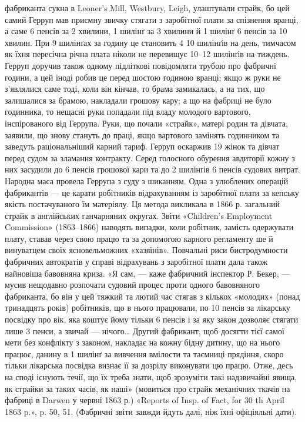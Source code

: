 {фабриканта сукна в Leoner’s Mill, Westbury, Leigh, улаштували страйк,
бо цей самий Герруп мав приємну звичку стягати з заробітної плати за
спізнення вранці, а саме 6 пенсів за 2 хвилини, 1 шилінґ за 3 хвилини й
1 шилінґ 6 пенсів за 10 хвилин. При 9 шилінґах за годину це становить
4 10 шилінґів на день, тимчасом як їхня пересічна річна
плата ніколи не перевищує 10--12 шилінґів на тиждень. Герруп доручив
також одному підліткові повідомляти трубою про фабричні години,
а цей іноді робив це перед шостою годиною вранці; якщо ж руки не з’являлися
саме тоді, коли він кінчав, то брама замикалась, а на тих, що залишалися
за брамою, накладали грошову кару; а що на фабриці не було
годинника, то нещасні руки попадали під владу молодого вартового,
інспірованого від Геррупа. Руки, що почали «страйк», матері родин
та дівчата, заявили, що знову стануть до праці, якщо вартового замінять
годинником та заведуть раціональніший карний тариф. Герруп
оскаржив 19 жінок та дівчат перед судом за зламання контракту. Серед
голосного обурення авдиторії кожну з них засудили до 6 пенсів грошової
кари та до 2 шилінґів 6 пенсів судових витрат. Народна маса провела
Геррупа з суду з шиканням. Одна з улюблених операцій фабрикантів
— це карати робітників відрахуванням із заробітної плати за
кепську якість постачуваного їм матеріялу. Ця метода викликала в 1866 р.
загальний страйк в англійських ганчарняних округах. Звіти «Children’s
Employment Commission» (1863--1866) наводять випадки, коли робітник,
замість одержувати плату, ставав через свою працю та за допомогою
карного регламенту ше й винуватцем своїх ясновельможних «хазяїнів».
Повчальні риси бистродумности фабричних автократів у справі відрахувань
з заробітної плати дала також найновіша бавовняна криза.
«Я сам, — каже фабричний інспектор Р. Бекер, — мусив нещодавно розпочати
судовий процес проти одного бавовняного фабриканта, бо він у цей тяжкий
та лютий час стягав з кількох «молодих» (понад тринадцять років)
робітників, що в нього працювали, по 10 пенсів за лікарську посвідку
про вік, яка коштує йому тільки 6 пенсів і за яку закон дозволяє стягати
лише 3 пенси, а звичай — нічого\dots{} Другий фабрикант, щоб досягти
тієї самої мети без конфлікту з законом, накладає на кожну бідну дитину,
що на нього працює, данину в 1 шилінґ за вивчення вмілости та
таємниці прядіння, скоро тільки лікарська посвідка визнає її за дозрілу
виконувати цю працю. Отже, десь на споді існують течії, що їх треба знати,
щоб зрозуміти такі надзвичайні явища, як страйки за таких часів, як
наші» (мовиться про страйк механічних ткачів на фабриці в Darwen у
червні 1863 р.) «Reports of Insp. of Fact, for 30 th April 1863 p.», p. 50,
51. (Фабричні звіти завжди йдуть далі, ніж їхні офіціяльні дати).
}

